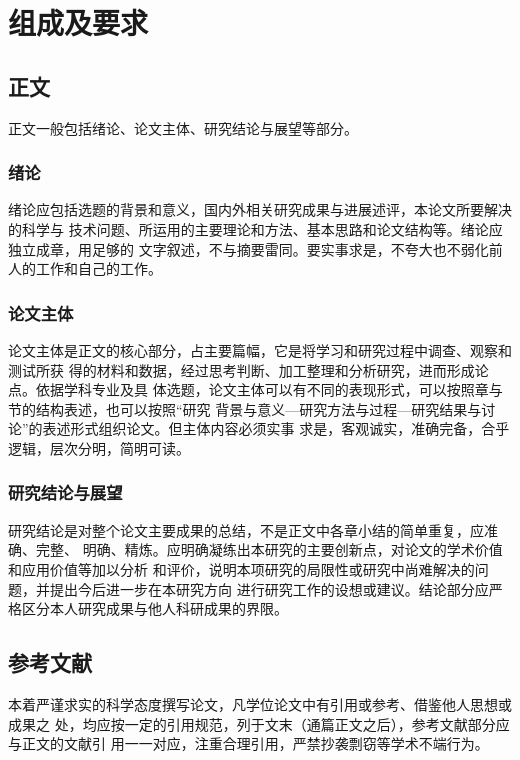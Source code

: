 \chapter{组成及要求}

\section{正文}

正文一般包括绪论、论文主体、研究结论与展望等部分。

\subsection{绪论}

绪论应包括选题的背景和意义，国内外相关研究成果与进展述评，本论文所要解决的科学与
技术问题、所运用的主要理论和方法、基本思路和论文结构等。绪论应独立成章，用足够的
文字叙述，不与摘要雷同。要实事求是，不夸大也不弱化前人的工作和自己的工作。

\subsection{论文主体}

论文主体是正文的核心部分，占主要篇幅，它是将学习和研究过程中调查、观察和测试所获
得的材料和数据，经过思考判断、加工整理和分析研究，进而形成论点。依据学科专业及具
体选题，论文主体可以有不同的表现形式，可以按照章与节的结构表述，也可以按照“研究
背景与意义—研究方法与过程—研究结果与讨论”的表述形式组织论文。但主体内容必须实事
求是，客观诚实，准确完备，合乎逻辑，层次分明，简明可读。

\subsection{研究结论与展望}

研究结论是对整个论文主要成果的总结，不是正文中各章小结的简单重复，应准确、完整、
明确、精炼。应明确凝练出本研究的主要创新点，对论文的学术价值和应用价值等加以分析
和评价，说明本项研究的局限性或研究中尚难解决的问题，并提出今后进一步在本研究方向
进行研究工作的设想或建议。结论部分应严格区分本人研究成果与他人科研成果的界限。

\section{参考文献}

本着严谨求实的科学态度撰写论文，凡学位论文中有引用或参考、借鉴他人思想或成果之
处，均应按一定的引用规范，列于文末（通篇正文之后），参考文献部分应与正文的文献引
用一一对应，注重合理引用，严禁抄袭剽窃等学术不端行为。

